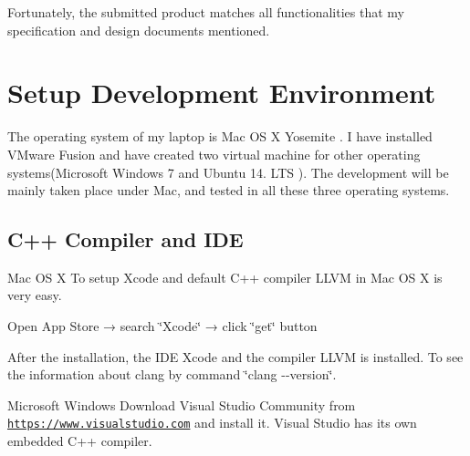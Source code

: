 Fortunately, the submitted product matches all functionalities that my specification and design documents mentioned. \hypertarget{_conformanceto_specificationand_design_manual_SetupDevelopmentEnvironment}{}\section{Setup Development Environment}\label{_conformanceto_specificationand_design_manual_SetupDevelopmentEnvironment}
The operating system of my laptop is Mac O\+S X Yosemite \cite{osxyosemite}. I have installed V\+Mware Fusion \cite{vmwarefusion} and have created two virtual machine for other operating systems(Microsoft Windows 7 \cite{microsoftwindows7} and Ubuntu 14. L\+T\+S \cite{ubuntu14_04LTS}). The development will be mainly taken place under Mac, and tested in all these three operating systems. \hypertarget{_conformanceto_specificationand_design_manual_SetupDevelopmentEnvironmentCppCompilerandIDE}{}\subsection{C++ Compiler and I\+D\+E}\label{_conformanceto_specificationand_design_manual_SetupDevelopmentEnvironmentCppCompilerandIDE}
\begin{DoxyParagraph}{Mac O\+S X}
To setup Xcode \cite{xcode} and default C++ compiler L\+L\+V\+M \cite{llvm} in Mac O\+S X is very easy.
\begin{DoxyItemize}
\item Open App Store → search \char`\"{}\+Xcode\char`\"{} → click \char`\"{}get\char`\"{} button
\end{DoxyItemize}
\end{DoxyParagraph}
After the installation, the I\+D\+E Xcode and the compiler L\+L\+V\+M is installed. To see the information about clang by command \char`\"{}clang -\/-\/version\char`\"{}. 
 \begin{DoxyParagraph}{Microsoft Windows}
Download Visual Studio Community \cite{visualstudiocommunity} from \href{https://www.visualstudio.com}{\tt https\+://www.\+visualstudio.\+com} and install it. Visual Studio has its own embedded C++ compiler. 
\end{DoxyParagraph}
